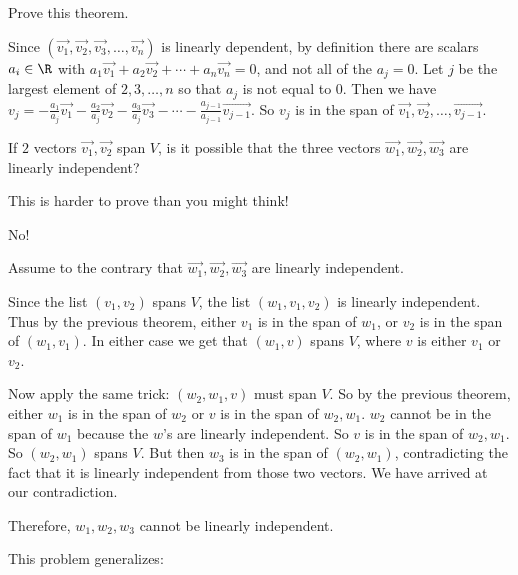 \documentclass{ximera}
\begin{document}
Prove this theorem.

\begin{free-response}
 	Since $(\vec{v_1},\vec{v_2},\vec{v_3}, \ldots, \vec{v_n})$ is linearly dependent, by definition there are scalars $a_i \in \R$ with 
 	$a_1\vec{v_1}+a_2\vec{v_2}+ \cdots +a_n\vec{v_n} = 0$, and not all of the $a_j =0$.  Let $j$ be the largest element of ${2,3,\ldots,n}$ so that $a_j$ is not equal to $0$.
 	Then we have 
 	$v_j = -\frac{a_1}{a_j}\vec{v_1}-\frac{a_2}{a_j}\vec{v_2} -\frac{a_3}{a_j}\vec{v_3} - \cdots -\frac{a_{j-1}}{a_{j-1}}\vec{v_{j-1}}$.
 	So $v_j$ is in the span of $\vec{v_1},\vec{v_2},\ldots,\vec{v_{j-1}}$.
 \end{free-response}
 
 
 	If $2$ vectors $\vec{v_1},\vec{v_2}$ span $V$, is it possible that the three vectors $\vec{w_1},\vec{w_2},\vec{w_3}$ are linearly independent?
 	
 	\begin{warning}
 		This is harder to prove than you might think!
 	\end{warning}
\begin{free-response}
	No!
	
	Assume to the contrary that $\vec{w_1},\vec{w_2},\vec{w_3}$ are linearly independent.
	
	Since the list $(v_1,v_2)$ spans $V$, the list $(w_1,v_1,v_2)$ is linearly independent.  Thus by the previous theorem, either $v_1$ is in the span of $w_1$,
	or $v_2$ is in the span of $(w_1,v_1)$.  In either case we get that $(w_1,v)$ spans $V$, where $v$ is either $v_1$ or $v_2$.
	
	Now apply the same trick:  $(w_2,w_1,v)$ must span $V$.  So by the previous theorem, either $w_1$ is in the span of $w_2$ or $v$ is in the span of $w_2,w_1$.  
	$w_2$ cannot be in the span of $w_1$ because the $w$'s are linearly independent.  So $v$ is in the span of $w_2,w_1$.  So $(w_2,w_1)$ spans $V$.  But then
	$w_3$ is in the span of $(w_2,w_1)$, contradicting the fact that it is linearly independent from those two vectors.  We have arrived at our contradiction.
	
	Therefore, $w_1,w_2,w_3$ cannot be linearly independent.
\end{free-response}

This problem generalizes:
\end{document}
